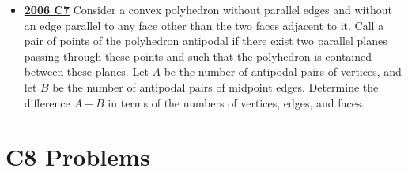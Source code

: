 \documentclass[11pt]{scrartcl}
\begin{document}
\begin{itemize}[leftmargin=*]
    \item \href{https://artofproblemsolving.com/community/c6h155703p875009}{\textbf{2006 C7}} Consider a convex polyhedron without parallel edges and without an edge parallel to any face other than the two faces adjacent to it. Call a pair of points of the polyhedron antipodal if there exist two parallel planes passing through these points and such that the polyhedron is contained between these planes. Let $A$ be the number of antipodal pairs of vertices, and let $B$ be the number of antipodal pairs of midpoint edges. Determine the difference $A-B$ in terms of the numbers of vertices, edges, and faces.
\end{itemize}
\newpage

\section*{C8 Problems} \label{C8}
\end{document}
